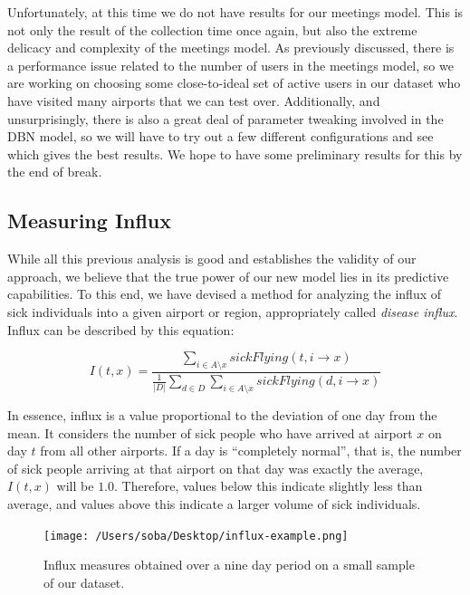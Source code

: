 \documentclass[11pt, letterpaper]{article}
\begin{document}
            Unfortunately, at this time we do not have results for our meetings model. This is not only the result of the collection time once again, but also the extreme delicacy and complexity of the meetings model. As previously discussed, there is a performance issue related to the number of users in the meetings model, so we are working on choosing some close-to-ideal set of active users in our dataset who have visited many airports that we can test over. Additionally, and unsurprisingly, there is also a great deal of parameter tweaking involved in the DBN model, so we will have to try out a few different configurations and see which gives the best results. We hope to have some preliminary results for this by the end of break.

        \subsection{Measuring Influx}
            While all this previous analysis is good and establishes the validity of our approach, we believe that the true power of our new model lies in its predictive capabilities. To this end, we have devised a method for analyzing the influx of sick individuals into a given airport or region, appropriately called \emph{disease influx}. Influx can be described by this equation:

            \[ I(t, x) = \frac{\sum_{i \in A \setminus x} sickFlying(t, i \rightarrow x)}{\frac{1}{|D|} \sum_{d \in D} \sum_{i \in A \setminus x} sickFlying(d, i \rightarrow x)} \]

            In essence, influx is a value proportional to the deviation of one day from the mean. It considers the number of sick people who have arrived at airport $x$ on day $t$ from all other airports. If a day is ``completely normal'', that is, the number of sick people arriving at that airport on that day was exactly the average, $I(t, x)$ will be $1.0$. Therefore, values below this indicate slightly less than average, and values above this indicate a larger volume of sick individuals.

            \begin{figure}[b!]
                \begin{center}
                    \texttt{[image: /Users/soba/Desktop/influx-example.png]}
                    \caption{Influx measures obtained over a nine day period on a small sample of our dataset.}
                    \label{influx-example}
                \end{center}
            \end{figure}
\end{document}
